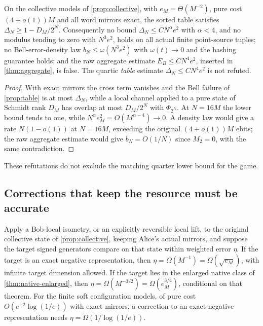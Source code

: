 \begin{proposition}\label{prop:collective-refutes}
On the collective models of \cref{prop:collective}, with $e_M=\Theta(M^{-2})$, pure cost $(4+o(1))M$ and all word mirrors exact, the
sorted table satisfies $\Delta_N\ge1-D_M/2^N$. Consequently no bound $\Delta_N\le CN^\alpha e^2$ with $\alpha<4$, and no modulus tending to zero
with $N^3e^2$, holds on all actual finite point-source tuples; no Bell-error-density law $b_N\le\omega(N^3e^2)$ with $\omega(t)\to0$ and
the hashing guarantee holds; and the raw aggregate estimate $E_B\le CN^4e^2$, inserted in \cref{thm:aggregate}, is false. The
quartic \emph{table} estimate $\Delta_N\le CN^4e^2$ is not refuted.
\end{proposition}

\begin{proof}
With exact mirrors the cross term vanishes and the Bell failure of \cref{prop:table} is at most $\Delta_N$, while a local channel
applied to a pure state of Schmidt rank $D_M$ has overlap at most $D_M/2^N$ with $\Phi_{2^N}$. At $N=16M$ the lower bound tends to one,
while $N^\alpha e_M^2=O(M^{\alpha-4})\to0$. A density law would give a rate $N(1-o(1))$ at $N=16M$, exceeding the original $(4+o(1))M$ ebits;
the raw aggregate estimate would give $b_N=O(1/N)$ since $M_2=0$, with the same contradiction.
\end{proof}

These refutations do not exclude the matching quarter lower bound for the game.

\subsection{Corrections that keep the resource must be accurate}\label{sec:corrections}

\begin{proposition}\label{prop:correction}
Apply a Bob-local isometry, or an explicitly reversible local lift, to the original collective state of \cref{prop:collective},
keeping Alice's actual mirrors, and suppose the target signed generators compare on that state within weighted error $\eta$. If
the target is an exact negative representation, then $\eta=\Omega(M^{-1})=\Omega(\sqrt{e_M})$, with infinite target dimension
allowed. If the target lies in the enlarged native class of \cref{thm:native-enlarged}, then $\eta=\Omega(M^{-3/2})=\Omega(e_M^{3/4})$,
conditional on that theorem. For the finite soft configuration models, of pure cost $O(e^{-2}\log(1/e))$ with exact mirrors, a
correction to an exact negative representation needs $\eta=\Omega(1/\log(1/e))$.
\end{proposition}

